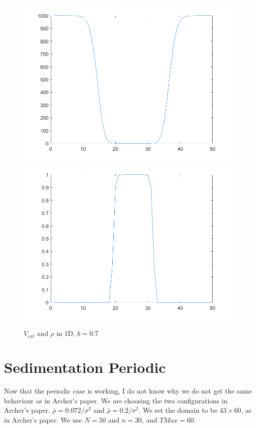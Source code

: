 \documentclass[11pt, a4paper]{article}
\theoremstyle{definition}
\begin{document}
	\begin{figure}[h]
		\centering
		\includegraphics[scale=0.25]{Vext2.png}
		\includegraphics[scale=0.25]{rho2.png}
		\caption{$V_{ext}$ and $\rho$ in 1D, $b =0.7$} 
		\label{F2a}
	\end{figure} 
	
	
	
	\section{Sedimentation Periodic}
	Now that the periodic case is working, I do not know why we do not get the same behaviour as in Archer's paper.
	We are choosing the two configurations in Archer's paper. $\bar \rho = 0.072/\sigma^2$ and $\bar \rho = 0.2 / \sigma^2$. We set the domain to be $43 \times 60$, as in Archer's paper. We use $N = 50$ and $n = 30$, and $TMax = 60$.
	
\end{document}
